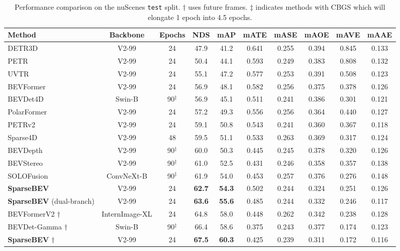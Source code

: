\documentclass[10pt,twocolumn,letterpaper]{article}
\begin{document}
\setlength{\tabcolsep}{4pt}
\begin{table*}[t]
  \centering
  \begin{tabular}{l|c|c|cc|ccccc}
    \toprule
    Method & Backbone & Epochs & NDS & mAP & mATE & mASE & mAOE & mAVE & mAAE \\ 
    \midrule
    DETR3D \cite{detr3d}           & V2-99 & 24 & 47.9 & 41.2 & 0.641 & 0.255 & 0.394 & 0.845 & 0.133 \\
    PETR \cite{petr}               & V2-99 & 24 & 50.4 & 44.1 & 0.593 & 0.249 & 0.383 & 0.808 & 0.132 \\
    UVTR \cite{uvtr}               & V2-99 & 24 & 55.1 & 47.2 & 0.577 & 0.253 & 0.391 & 0.508 & 0.123 \\
    BEVFormer \cite{bevformer}     & V2-99 & 24 & 56.9 & 48.1 & 0.582 & 0.256 & 0.375 & 0.378 & 0.126 \\
    BEVDet4D \cite{bevdet4d}       & Swin-B \cite{swin} & 90$^\ddagger$ & 56.9 & 45.1 & 0.511 & 0.241 & 0.386 & 0.301 & 0.121 \\
    PolarFormer \cite{polarformer} & V2-99 & 24 & 57.2 & 49.3 & 0.556 & 0.256 & 0.364 & 0.440 & 0.127 \\
    PETRv2 \cite{petrv2}           & V2-99 & 24 & 59.1 & 50.8 & 0.543 & 0.241 & 0.360 & 0.367 & 0.118 \\
    Sparse4D \cite{sparse4d}       & V2-99 & 48 & 59.5 & 51.1 & 0.533 & 0.263 & 0.369 & 0.317 & 0.124 \\
    BEVDepth \cite{bevdepth}       & V2-99 & 90$^\ddagger$ & 60.0 & 50.3 & 0.445 & 0.245 & 0.378 & 0.320 & 0.126 \\
    BEVStereo \cite{bevstereo}     & V2-99 & 90$^\ddagger$ & 61.0 & 52.5 & 0.431 & 0.246 & 0.358 & 0.357 & 0.138 \\
    SOLOFusion \cite{solofusion}   & ConvNeXt-B \cite{convnext} & 90$^\ddagger$ & 61.9 & 54.0 & 0.453 & 0.257 & 0.376 & 0.276 & 0.148 \\
    \rowcolor{Gray}
    \textbf{SparseBEV}             & V2-99 & 24 & \textbf{62.7} & \textbf{54.3} & 0.502 & 0.244 & 0.324 & 0.251 & 0.126 \\
    \rowcolor{Gray}
    \textbf{SparseBEV} (dual-branch) & V2-99 & 24 & \textbf{63.6} & \textbf{55.6} & 0.485 & 0.244 & 0.332 & 0.246 & 0.117 \\
    \midrule
    BEVFormerV2 $\dagger$ \cite{bevformerv2} & InternImage-XL \cite{internimage} & 24 & 64.8 & 58.0 & 0.448 & 0.262 & 0.342 & 0.238 & 0.128 \\
    BEVDet-Gamma $\dagger$ \cite{bevpoolv2}  & Swin-B & 90$^\ddagger$ & 66.4 & 58.6 & 0.375 & 0.243 & 0.377 & 0.174 & 0.123 \\
    \rowcolor{Gray}
    \textbf{SparseBEV} $\dagger$             & V2-99 & 24 & \textbf{67.5} & \textbf{60.3} & 0.425 & 0.239 & 0.311 & 0.172 & 0.116 \\
    \bottomrule
  \end{tabular}
  \vspace{-5pt}
  \caption{Performance comparison on the nuScenes \texttt{test} split. $\dagger$ uses future frames. $\ddagger$ indicates methods with CBGS \cite{cbgs} which will elongate 1 epoch into 4.5 epochs.}
  \label{table:nuscenes_test}
\end{table*}
\end{document}
